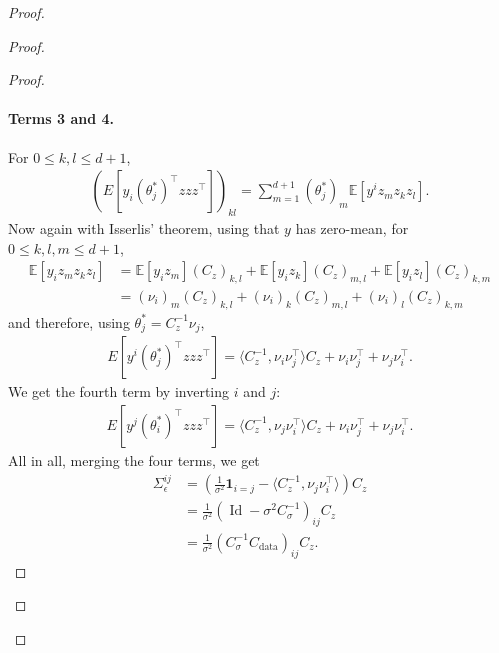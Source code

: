 \documentclass[11pt]{article}
\newcommand{\id}{\operatorname{Id}}
\newcommand{\EE}{\mathbb{E}}
\begin{document}
\begin{proof}
\begin{proof}
\begin{proof}
\paragraph{Terms 3 and 4.} For $0 \leq k,l \leq d+1$,
\begin{align*}
(E[y_i (\theta_j^*)^\top z  z z^\top])_{kl} = \sum_{m=1}^{d+1}
 (\theta_j^*)_m\EE[y^i z_m z_k z_l].
 \end{align*}
Now again with Isserlis' theorem, using that $y$ has zero-mean, for $0 \leq k,l,m \leq d+1$,
\begin{align*}
\EE[y_i z_m z_k z_l] %
&= \EE[y_i z_m] (C_z)_{k,l} + \EE[y_i  z_k]  (C_z)_{m,l} +  \EE[y_i z_l]  (C_z)_{k,m} \\
&= (\nu_i)_m (C_z)_{k,l} + (\nu_i)_k (C_z)_{m,l} + (\nu_i)_l (C_z)_{k,m}
 \end{align*}
 and therefore, using $\theta_j^* = C_z^{-1}\nu_j$, 
 \begin{align*}
 E[y^i (\theta_j^*)^\top z  z z^\top] = \langle C_z^{-1}, \nu_i \nu_j^\top \rangle C_z + \nu_i \nu_j^\top + \nu_j \nu_i^\top.
 \end{align*}
We get the fourth term by inverting $i$ and $j$:
 \begin{align*}
 E[y^j (\theta_i^*)^\top z  z z^\top] = \langle C_z^{-1}, \nu_j \nu_i^\top \rangle C_z + \nu_i \nu_j^\top + \nu_j \nu_i^\top .
 \end{align*}
All in all, merging the four terms, we get
\begin{align*}
\Sigma^{ij}_\epsilon &= \left( \frac{1}{\sigma^2}\mathbf{1}_{i=j} - \langle C_z^{-1}, \nu_j \nu_i^\top \rangle \right) C_z \\
&= \frac{1}{\sigma^2} (\id - \sigma^2 C_\sigma^{-1})_{ij} C_z \\
&= \frac{1}{\sigma^2} (C_\sigma^{-1}C_\mathrm{data})_{ij} C_z .
 \end{align*}


\end{proof}
\end{proof}
\end{proof}
\end{document}
